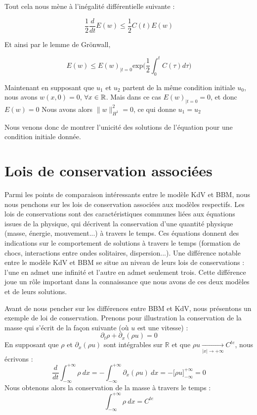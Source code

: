 Tout cela nous mène à l'inégalité différentielle suivante :

$$ \frac{1}{2} \frac{d}{dt} E(w) \leq \frac{1}{2}C(t) E(w) $$

Et ainsi par le lemme de Grönwall, 

$$ E(w) \leq E(w)_{|t=0} \text{exp}\biggl(\frac{1}{2}\int_{0}^{t} C(\tau)d\tau \biggr) $$

Maintenant en supposant que $u_1$ et $u_2$ partent de la même condition initiale $u_0$, nous avons $w(x,0) = 0$, $\forall x \in \mathbb{R}$.
Mais dans ce cas $E(w)_{|t=0} = 0$, et donc $E(w)=0$
Nous avons alors $\|w\|_{H^1}^2 = 0$, ce qui donne $u_1 = u_2$

Nous venons donc de montrer l'unicité des solutions de l'équation pour une condition initiale donnée.

\section{Lois de conservation associées}

Parmi les points de comparaison intéressants entre le modèle KdV et BBM, nous nous penchons sur les lois de conservation associées aux modèles respectifs.
Les lois de conservations sont des caractéristiques communes liées aux équations issues de la physique, qui décrivent la conservation d'une quantité physique (masse, énergie, mouvement...) à travers le temps. Ces équations donnent des indications sur le comportement de solutions à travers le temps (formation de chocs, interactions entre ondes solitaires, dispersion...). 
Une différence notable entre le modèle KdV et BBM se situe au niveau de leurs lois de conservations : l'une en admet une infinité et l'autre en admet seulement trois. Cette différence joue un rôle important dans la connaissance que nous avons de ces deux modèles et de leurs solutions. 

\vspace{1em}

Avant de nous pencher sur les différences entre BBM et KdV, nous présentons un exemple de loi de conservation. Prenons pour illustration la conservation de la masse qui s'écrit de la façon suivante (où $u$ est une vitesse) :
$$\partial_t \rho + \partial_x(\rho u) = 0$$
En supposant que $\rho$ et $\partial_x(\rho u)$ sont intégrables sur $\mathbb{R}$ et que $\rho u \xrightarrow[|x| \to +\infty]{} C^{te}$, nous écrivons :
$$\frac{d}{dt}\int_{-\infty}^{+\infty} \rho \ dx = - \int_{-\infty}^{+\infty} \partial_x(\rho u) \ dx = - \big[\rho u\big]_{-\infty}^{+\infty} = 0$$
Nous obtenons alors la conservation de la masse à travers le temps :
$$\int_{-\infty}^{+\infty} \rho \ dx = C^{te}$$

